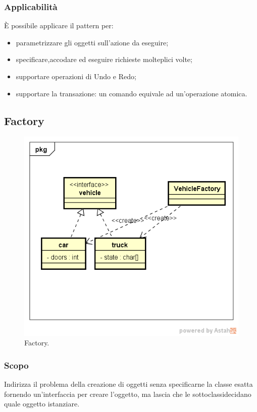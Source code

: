 \subsubsection{Applicabilità} È possibile applicare il pattern per:
\begin{itemize}
	\item parametrizzare gli oggetti sull'azione da eseguire;
	\item specificare,accodare ed eseguire richieste molteplici volte;
	\item supportare operazioni di Undo e Redo;
	\item supportare la transazione: un comando equivale ad un'operazione atomica.
\end{itemize}

\subsection{Factory}

\begin{figure}[H] \label{fig:factory}
	\includegraphics[scale=0.34]{img/factory2.png}
	\caption{Factory.}
\end{figure}

\subsubsection{Scopo} Indirizza il problema della creazione di oggetti senza specificarne la classe esatta fornendo un'interfaccia per creare l'oggetto, ma lascia che le sottoclassidecidano quale oggetto istanziare.

